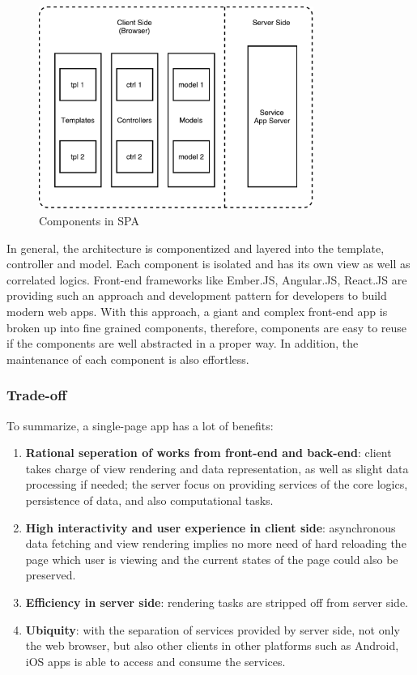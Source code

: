 \begin{figure}[!htbp]
  \centering
    \includegraphics[width=0.8\textwidth]{Figures/tech-web-arch-cmp.pdf}
  \caption{Components in SPA}
  \label{fig:3.4}
\end{figure}

In general, the architecture is componentized and layered into the template, controller and model. Each component is isolated and has its own view as well as correlated logics. Front-end frameworks like Ember.JS, Angular.JS, React.JS are providing such an approach and development pattern for developers to build modern web apps. With this approach, a giant and complex front-end app is broken up into fine grained components, therefore, components are easy to reuse if the components are well abstracted in a proper way. In addition, the maintenance of each component is also effortless.


\subsubsection{Trade-off}
To summarize, a single-page app has a lot of benefits:
\begin{enumerate}
\item
\textbf{Rational seperation of works from front-end and back-end}: client takes charge of view rendering and data representation, as well as slight data processing if needed; the server focus on providing services of the core logics, persistence of data, and also computational tasks.
\item
\textbf{High interactivity and user experience in client side}: asynchronous data fetching and view rendering implies no more need of hard reloading the page which user is viewing and the current states of the page could also be preserved.
\item
\textbf{Efficiency in server side}: rendering tasks are stripped off from server side.
\item
\textbf{Ubiquity}: with the separation of services provided by server side, not only the web browser, but also other clients in other platforms such as Android, iOS apps is able to access and consume the services.
\end{enumerate}


